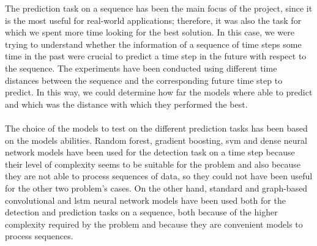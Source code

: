 The prediction task on a sequence has been the main focus of the project, since it is the most useful for real-world applications; therefore, it was also the task for which we spent more time looking for the best solution. In this case, we were trying to understand whether the information of a sequence of time steps some time in the past were crucial to predict a time step in the future with respect to the sequence. The experiments have been conducted using different time distances between the sequence and the corresponding future time step to predict. In this way, we could determine how far the models where able to predict and which was the distance with which they performed the best.

\paragraph{} The choice of the models to test on the different prediction tasks has been based on the models abilities. Random forest, gradient boosting, \acs{svm} and dense neural network models have been used for the detection task on a time step because their level of complexity seems to be suitable for the problem and also because they are not able to process sequences of data, so they could not have been useful for the other two problem's cases. On the other hand, standard and graph-based convolutional and \acs{lstm} neural network models have been used both for the detection and prediction tasks on a sequence, both because of the higher complexity required by the problem and because they are convenient models to process sequences.

